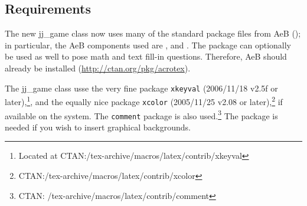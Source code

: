 \documentclass{article}
\def\jj{\textsf{jj\_game}}
\begin{document}

%

\subsection{Requirements}

The new {\jj} class now uses many of the standard package files from AeB
(\cAcroEB); in particular, the AeB components used are ,
 and . The  package can optionally
be used as well to pose math and text fill-in questions. Therefore, AeB should already be installed
(\url{http://ctan.org/pkg/acrotex}).


The {\jj} class usse the very fine package \texttt{xkeyval}  (2006/11/18
v2.5f or later),\footnote{Located at
CTAN:/tex-archive/macros/latex/contrib/xkeyval}, and the equally nice package
\texttt{xcolor} (2005/11/25 v2.08 or
later),\footnote{CTAN:/tex-archive/macros/latex/contrib/xcolor} if available
on the system. The \texttt{comment} package is also used.\footnote{CTAN:
/tex-archive/macros/latex/contrib/comment} The  package is needed if
you wish to insert graphical backgrounds.
\end{document}
